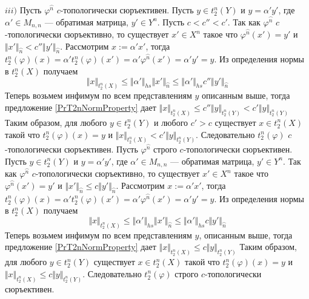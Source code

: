 \documentclass[12pt]{article}
\begin{document}
$iii)$ Пусть $\varphi^{\wideparen{n}}$  $c$-топологически сюръективен. Пусть $y\in t_2^n(Y)$ и $y=\alpha' y'$, где $\alpha'\in M_{n,n}$ --- обратимая матрица, $y'\in Y^n$. Пусть $c<c''<c'$. Так как 
$\varphi^{\wideparen{n}}$ $c$-топологически сюръективно, то существует $x'\in X^n$ такое что $\varphi^{\wideparen{n}}(x')=y'$ и $\Vert x'\Vert_{\wideparen{n}}< c''\Vert y'\Vert_{\wideparen{n}}$. Рассмотрим 
$x:=\alpha'x'$, тогда $t_2^n(\varphi)(x)=\alpha't_2^n(\varphi)(x')=\alpha'\varphi^{\wideparen{n}}(x')=\alpha' y'=y$. Из определения нормы в $t_2^n(X)$ получаем
$$
\Vert x\Vert_{t_2^n(X)}
\leq\Vert\alpha'\Vert_{hs}\Vert x'\Vert_{\wideparen{n}}
\leq\Vert\alpha'\Vert_{hs} c''\Vert y'\Vert_{\wideparen{n}}
$$
Теперь возьмем инфимум по всем представлениям $y$ описанным выше, тогда предложение \ref{PrT2nNormProperty} дает $\Vert x\Vert_{t_2^n(X)}\leq c''\Vert y\Vert_{t_2^n(Y)}<c'\Vert y\Vert_{t_2^n(Y)}$
Таким образом, для любого $y\in t_2^n(Y)$ и любого $c'>c$ существует $x\in t_2^n(X)$ такой что $t_2^n(\varphi)(x)=y$ и $\Vert x\Vert_{t_2^n(X)}< c'\Vert y\Vert_{t_2^n(Y)}$. Следовательно $t_2^n(\varphi)$ 
$c$-топологически сюръективен.
\newline
Пусть $\varphi^{\wideparen{n}}$ строго $c$-топологически сюръективен. Пусть $y\in t_2^n(Y)$ и $y=\alpha' y'$, где $\alpha'\in M_{n,n}$ --- обратимая матрица, $y'\in Y^n$. Так как $\varphi^{\wideparen{n}}$ $c$-топологически 
сюръективно, то существует $x'\in X^n$ такое что $\varphi^{\wideparen{n}}(x')=y'$ и $\Vert x'\Vert_{\wideparen{n}}\leq c\Vert y'\Vert_{\wideparen{n}}$. Рассмотрим $x:=\alpha'x'$, тогда 
$t_2^n(\varphi)(x)=\alpha't_2^n(\varphi)(x')=\alpha'\varphi^{\wideparen{n}}(x')=\alpha' y'=y$. Из определения нормы в $t_2^n(X)$ получаем
$$
\Vert x\Vert_{t_2^n(X)}
\leq\Vert\alpha'\Vert_{hs}\Vert x'\Vert_{\wideparen{n}}
\leq\Vert\alpha'\Vert_{hs} c\Vert y'\Vert_{\wideparen{n}}
$$
Теперь возьмем инфимум по всем представлениям $y$, описанным выше, тогда предложение \ref{PrT2nNormProperty} дает $\Vert x\Vert_{t_2^n(X)}\leq c\Vert y\Vert_{t_2^n(Y)}$
Таким образом, для любого $y\in t_2^n(Y)$ существует $x\in t_2^n(X)$ такой что $t_2^n(\varphi)(x)=y$ и $\Vert x\Vert_{t_2^n(X)}\leq c\Vert y\Vert_{t_2^n(Y)}$. Следовательно $t_2^n(\varphi)$ строго $c$-топологически сюръективен.
\end{document}
